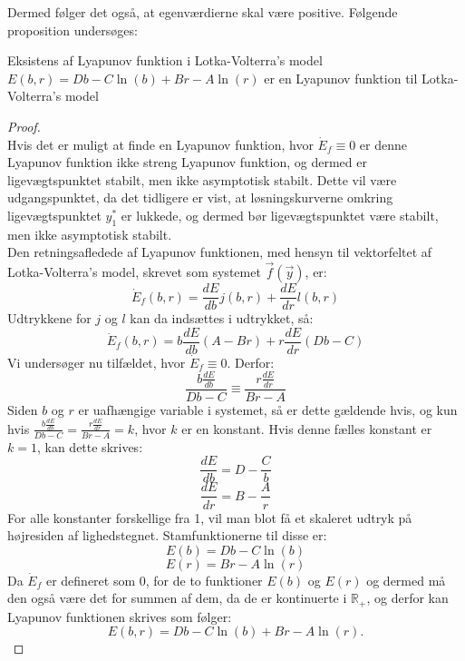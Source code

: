 Dermed følger det også, at egenværdierne skal være positive.
Følgende proposition undersøges: 
\begin{prop}{Eksistens af Lyapunov funktion i Lotka-Volterra's model}{}
$E(b,r)=Db-C\ln(b)+Br-A\ln(r)$ er en Lyapunov funktion til Lotka-Volterra's model
\end{prop}
\begin{proof}\\
Hvis det er muligt at finde en Lyapunov funktion, hvor $\dot{E}_f\equiv0$ er denne Lyapunov funktion ikke streng Lyapunov funktion, og dermed er ligevægtspunktet stabilt, men ikke asymptotisk stabilt. Dette vil være udgangspunktet, da det tidligere er vist, at løsningskurverne omkring ligevægtspunktet $y_1^*$ er lukkede, og dermed bør ligevægtspunktet være stabilt, men ikke asymptotisk stabilt. \\
Den retningsafledede af Lyapunov funktionen, med hensyn til vektorfeltet af Lotka-Volterra's model, skrevet som systemet $\vec{f}(\vec{y})$, er:
$$\dot{E}_f(b,r)=\frac{dE}{db}j(b,r)+\frac{dE}{dr}l(b,r)$$
Udtrykkene for $j$ og $l$ kan da indsættes i udtrykket, så:
$$\dot{E}_f(b,r)=b\frac{dE}{db}(A-Br)+r\frac{dE}{dr}(Db-C)$$
Vi undersøger nu tilfældet, hvor $\dot{E}_f\equiv 0$. Derfor:
$$\frac{b\frac{dE}{db}}{Db-C}\equiv \frac{r\frac{dE}{dr}}{Br-A}$$
Siden $b$ og $r$ er uafhængige variable i systemet, så er dette gældende hvis, og kun hvis $\frac{b\frac{dE}{db}}{Db-C} = \frac{r\frac{dE}{dr}}{Br-A}=k$, hvor $k$ er en konstant. Hvis denne fælles konstant er $k=1$, kan dette skrives:
$$\frac{dE}{db}=D-\frac{C}{b}$$
$$\frac{dE}{dr}=B-\frac{A}{r}$$
For alle konstanter forskellige fra 1, vil man blot få et skaleret udtryk på højresiden af lighedstegnet.
Stamfunktionerne til disse er:
$$E(b)=Db-C\ln(b)$$
$$E(r)=Br-A\ln(r)$$
Da $\dot{E}_f$ er defineret som 0, for de to funktioner $E(b)$ og $E(r)$ og dermed må den også være det for summen af dem, da de er kontinuerte i $\mathbb{R}_+$, og derfor kan Lyapunov funktionen skrives som følger:
\begin{equation}\label{LyapunovLoVo}
    E(b,r)=Db-C\ln(b)+Br-A\ln(r).
\end{equation}


\end{proof}
